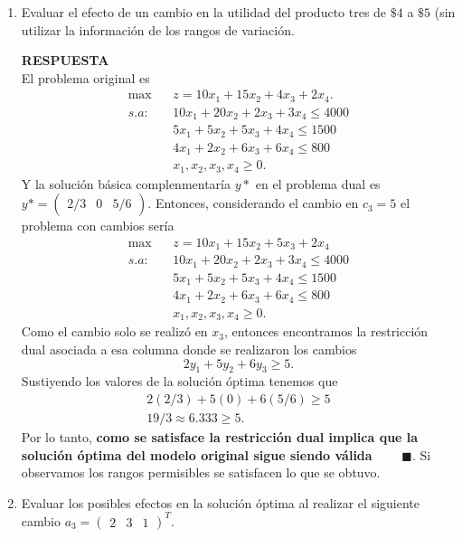 \documentclass[11pt,letterpaper]{article}
\newcommand{\res}{\textbf{RESPUESTA}\\}
\newcommand{\fin}{$\blacksquare.$}
\begin{document}
\begin{enumerate}
\item Evaluar el efecto de un cambio en la utilidad del producto tres de $\$4$ a $\$5$ (sin utilizar la información de los rangos de variación.

\res El problema original es 
\begin{align*}
\max\ \ \ \ & z=10x_1+15x_2+4x_3+2x_4.\\
s.a:\ \ \ \ & 10x_1+20x_2 +2x_3+3x_4\leq 4000\\
	 & 5x_1+5x_2+5x_3+4x_4\leq 1500\\
	 & 4x_1+2x_2+6x_3+6x_4 \leq 800\\
	 & x_1,x_2,x_3,x_4 \geq 0. 
\end{align*}
Y la solución básica complenmentaría $y*$ en el problema dual es $y*= \begin{pmatrix}
2/3& 0 & 5/6
\end{pmatrix}$. Entonces, considerando el cambio en $c_3=5$ el problema con cambios sería
\begin{align*}
\max\ \ \ \ & z=10x_1+15x_2+5x_3+2x_4\\
s.a:\ \ \ \ & 10x_1+20x_2 +2x_3+3x_4\leq 4000\\
	 & 5x_1+5x_2+5x_3+4x_4\leq 1500\\
	 & 4x_1+2x_2+6x_3+6x_4 \leq 800\\
	 & x_1,x_2,x_3,x_4 \geq 0. 
\end{align*}
Como el cambio solo se realizó en $x_3$, entonces encontramos la restricción dual asociada a esa columna donde se realizaron los cambios
$$2y_1+5y_2+6y_3\geq 5.$$
Sustiyendo los valores de la solución óptima tenemos que 
\begin{align*}
2(2/3)+5(0)+6(5/6)\geq 5\\
19/3\approx 6.333\geq 5.
\end{align*}
Por lo tanto, \textbf{como se satisface la restricción dual implica que la solución óptima del modelo original sigue siendo válida} \ \ \ \ \fin
Si observamos los rangos permisibles se satisfacen lo que se obtuvo.

\item Evaluar los posibles efectos en la solución óptima al realizar el siguiente cambio $a_3= \begin{pmatrix}
2 & 3 & 1
\end{pmatrix}^T$.


\end{enumerate}
\end{document}
